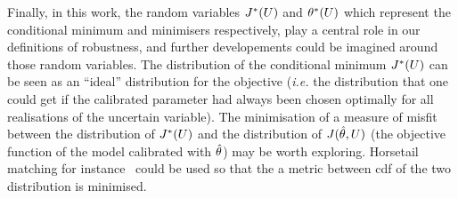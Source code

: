 \documentclass[../../Main_ManuscritThese.tex]{subfiles}
\begin{document}
Finally, in this work, the random variables $J^*(U)$ and
$\theta^*(U)$ which represent the conditional minimum and minimisers
respectively, play a central role in our definitions of robustness,
and further developements could be imagined around those random
variables.
The distribution of the conditional minimum $J^*(U)$ can be seen as
an ``ideal'' distribution for the objective (\emph{i.e.} the
distribution that one could get if the calibrated parameter had always
been chosen optimally for all realisations of the uncertain
variable). The minimisation of a measure of misfit between the
distribution of $J^*(U)$ and the distribution of $J(\hat{\theta},U)$
(the objective function of the model calibrated with $\hat{\theta}$) may
be worth exploring. Horsetail matching for
instance~\citep{cook_extending_2017,cook_horsetail_2018} could be used
so that the a metric between cdf of the two distribution is minimised.
\thispagestyle{plain}
\markchapterend
\subfileLocal{
	\pagestyle{empty}
	
        
}

\end{document}
